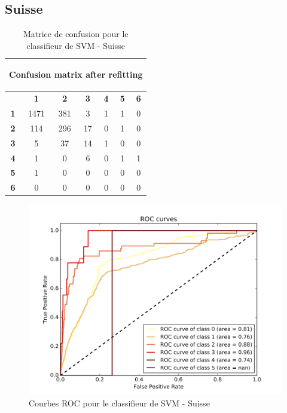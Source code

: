\documentclass{book}
\begin{document}
\subsection{Suisse}

\begin{table}[H]
  \begin{center}
  \begin{adjustbox}{max width=\textwidth}
  \begin{tabular}{|c|c|c|c|c|c|c|}
    \hline
    \multicolumn{7}{|c|}{{ \begin{bf}Confusion matrix after refitting\end{bf}}} \\
    \hline
     & \textbf{1} & \textbf{2} & \textbf{3} & \textbf{4} & \textbf{5} & \textbf{6}\\
    \hline
    \textbf{1} & 1471 & 381 & 3 & 1 & 1 & 0\\
    \hline
    \textbf{2} & 114 & 296 & 17 & 0 & 1 & 0\\
    \hline
    \textbf{3} & 5 & 37 & 14 & 1 & 0 & 0\\
    \hline
    \textbf{4} & 1 & 0 & 6 & 0 & 1 & 1\\
    \hline
    \textbf{5} & 1 & 0 & 0 & 0 & 0 & 0\\
    \hline
    \textbf{6} & 0 & 0 & 0 & 0 & 0 & 0\\
    \hline
  \end{tabular}
  \end{adjustbox}
  \end{center}
  \caption{Matrice de confusion pour le classifieur de SVM - Suisse}
  \label{svm_cm_suisse}
\end{table}

\begin{figure}[H]
 \begin{center}
\includegraphics[scale=0.4]{../../data/Suisse/test/Support_Vector_Gaussian_Classification/Support_Vector_Gaussian_Classification_roc.png}
 \end{center}
 \caption{Courbes ROC pour le classifieur de SVM - Suisse}
 \label{svm_roc_suisse}
\end{figure}
\end{document}

